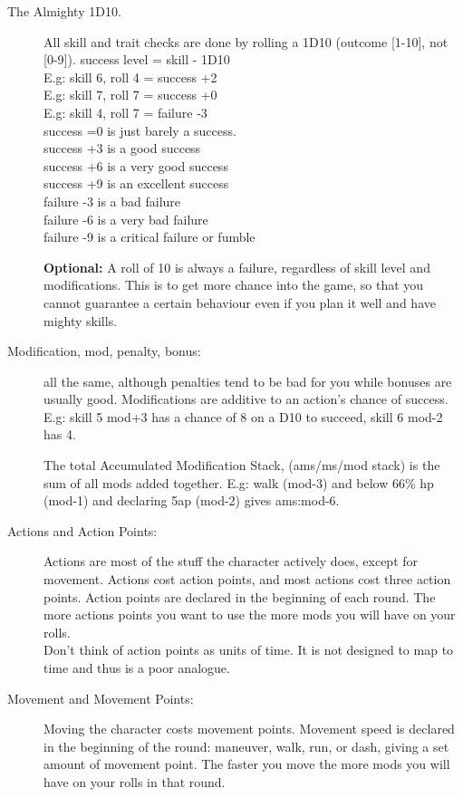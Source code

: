 \begin{description}

\item[The Almighty 1D10.] All skill and trait checks are done by rolling a 1D10 (outcome [1-10], not [0-9]).
success level = skill - 1D10 \\
E.g: skill 6, roll 4 = success +2 \\
E.g: skill 7, roll 7 = success +0 \\
E.g: skill 4, roll 7 = failure -3 \\
success =0 is just barely a success. \\
success +3 is a good success \\
success +6 is a very good success \\
success +9 is an excellent success \\
failure -3 is a bad failure \\
failure -6 is a very bad failure \\
failure -9 is a critical failure or fumble

\textbf{Optional:} A roll of 10 is always a failure, regardless of skill level and modifications. This is to get more chance into the game, so that you cannot guarantee a certain behaviour even if you plan it well and have mighty skills.

\item[Modification, mod, penalty, bonus:] all the same, although penalties tend to be bad for you while bonuses are usually good. Modifications are additive to an action's chance of success. \\
E.g: skill 5 mod+3 has a chance of 8 on a D10 to succeed, skill 6 mod-2 has 4.

The total Accumulated Modification Stack, (ams/ms/mod stack) is the sum of all mods added together. E.g: walk (mod-3) and below 66\% hp (mod-1) and declaring 5ap (mod-2) gives ams:mod-6.

\item[Actions and Action Points:]
Actions are most of the stuff the character actively does, except for movement. Actions cost action points, and most actions cost three action points.
Action points are declared in the beginning of each round. The more actions points you want to use the more mods you will have on your rolls.\\
Don't think of action points as units of time. It is not designed to map to time and thus is a poor analogue.

\item[Movement and Movement Points:]
Moving the character costs movement points. Movement speed is declared in the beginning of the round: maneuver, walk, run, or dash, giving a set amount of movement point. The faster you move the more mods you will have on your rolls in that round.


\end{description}
